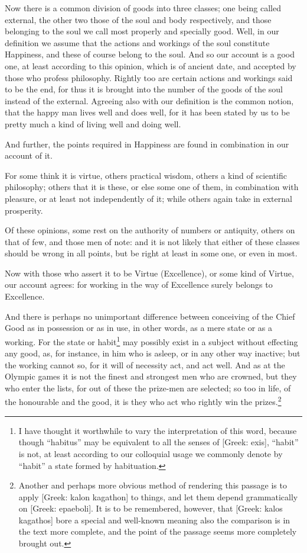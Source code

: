 Now there is a common division of goods into three classes; one being called
external, the other two those of the soul and body respectively, and those
belonging to the soul we call most properly and specially good. Well, in our
definition we assume that the actions and workings of the soul constitute
Happiness, and these of course belong to the soul. And so our account is a good
one, at least according to this opinion, which is of ancient date, and accepted
by those who profess philosophy. Rightly too are certain actions and workings
said to be the end, for thus it is brought into the number of the goods of the
soul instead of the external. Agreeing also with our definition is the common
notion, that the happy man lives well and does well, for it has been stated by
us to be pretty much a kind of living well and doing well.

And further, the points required in Happiness are found in combination in our
account of it.

For some think it is virtue, others practical wisdom, others a kind of
scientific philosophy; others that it is these, or else some one of them, in
combination with pleasure, or at least not independently of it; while others
again take in external prosperity.

Of these opinions, some rest on the authority of numbers or antiquity, others
on that of few, and those men of note: and it is not likely that either of
these classes should be wrong in all points, but be right at least in some one,
or even in most.

Now with those who assert it to be Virtue (Excellence), or some kind of Virtue,
our account agrees: for working in the way of Excellence surely belongs to
Excellence.

And there is perhaps no unimportant difference between conceiving of the Chief
Good as in possession or as in use, in other words, as a mere state or as a
working. For the state or habit\footnote{I have thought it worthwhile to vary the interpretation of this word, because
though “habitus” may be equivalent to all the senses of [Greek:
exis], “habit” is not, at least according to our colloquial usage
we commonly denote by “habit” a state formed by habituation.}
may possibly exist in a subject without effecting any good, as, for instance,
in him who is asleep, or in any other way inactive; but the working cannot so,
for it will of necessity act, and act well. And as at the Olympic games it is
not the finest and strongest men who are crowned, but they who enter the lists,
for out of these the prize-men are selected; so too in life, of the honourable
and the good, it is they who act who rightly win the prizes.\footnote{Another and perhaps more obvious method of rendering this passage is to apply
[Greek: kalon kagathon] to things, and let them depend grammatically on [Greek:
epaeboli]. It is to be remembered, however, that [Greek: kalos kagathos] bore a
special and well-known meaning also the comparison is in the text more
complete, and the point of the passage seems more completely brought out.}

